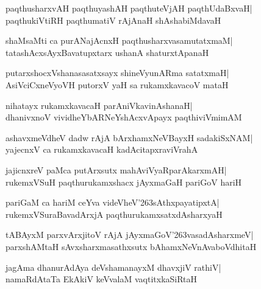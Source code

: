 \documentclass[twoside,12pt,openright]{book}
\def\S{\char'263}
\newcounter{shloka}[chapter]
\begin{document}
\begin{shloka}%
paqthusharxvAH paqthuyashAH paqthuteVjAH paqthUdaBxvaH|\\
paqthukiVtiRH paqthumatiV rAjAnaH shAshabiMdavaH
\end{shloka}

\begin{shloka}%
shaMsaMti ca purANajAcnxH paqthusharxvasamutatxmaM|\\
tatashAcxsAyxBavatupxtarx ushanA shaturxtApanaH
\end{shloka}

\begin{shloka}%
putarxshocxVshanasasatxsayx shineVyunARma satatxmaH|\\
AsiVciCxneVyoVH putorxV yaH sa rukamxkavacoV mataH
\end{shloka}

\begin{shloka}%
nihatayx rukamxkavacaH parAniVkavinAshanaH|\\
dhanivxnoV vividheYbARNeYshAcxvApayx paqthiviVmimAM
\end{shloka}

\begin{shloka}%
ashavxmeVdheV dadw rAjA bArxhamxNeVBayxH sadakiSxNAM|\\
yajecnxV ca rukamxkavacaH kadAcitapxraviVrahA
\end{shloka}

\begin{shloka}%
jajicnxreV paMca putArxsutx mahAviVyaRparAkarxmAH|\\
rukemxVSuH paqthurukamxshacx jAyxmaGaH pariGoV hariH
\end{shloka}

\begin{shloka}%
pariGaM ca hariM ceYva videVheV\S sAthxpayatipxtA|\\
rukemxVSuraBavadArxjA paqthurukamxsatxdAsharxyaH
\end{shloka}

\begin{shloka}%
tABAyxM parxvArxjitoV rAjA jAyxmaGoV\S vasadAsharxmeV|\\
parxshAMtaH sAvxsharxmasathxsutx bAhamxNeVnAvaboVdhitaH
\end{shloka}

\begin{shloka}%
jagAma dhanurAdAya deVshamanayxM dhavxjiV rathiV|\\
namaRdAtaTa EkAkiV keVvalaM vaqtitxkaSiRtaH
\end{shloka}
\end{document}
